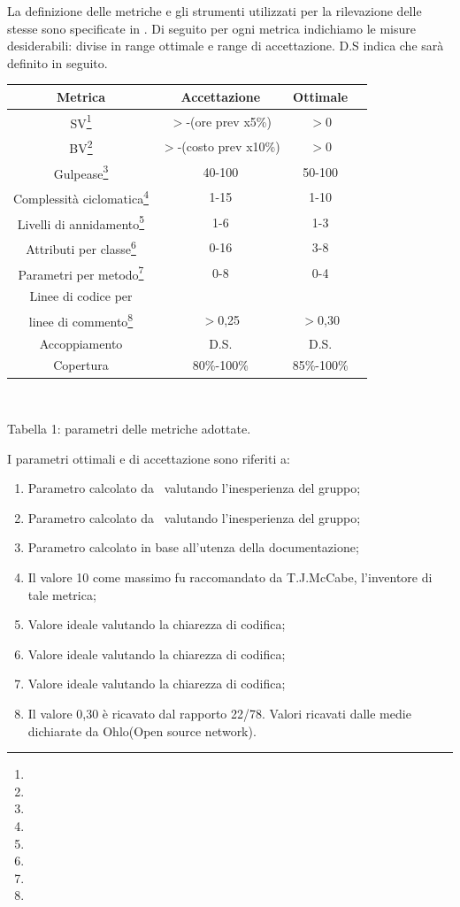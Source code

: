 La definizione delle metriche e gli strumenti utilizzati per la rilevazione delle stesse sono specificate in \infoNDP. Di seguito per ogni metrica indichiamo le misure desiderabili: divise in range ottimale e range di accettazione. D.S indica che sarà definito in seguito.\\
\begin{tabular}{|c|c|c|c|}
\hline
\textbf{Metrica} & \textbf{Accettazione} & \textbf{Ottimale}\\
\hline
SV\footnote{}&$>$-(ore prev x5\%)&$>$0\\
\hline
BV\footnote{}&$>$-(costo prev x10\%)&$>$0\\
\hline
Gulpease\footnote{}&40-100&50-100\\
\hline
Complessità ciclomatica\footnote{}&1-15&1-10\\
\hline
Livelli di annidamento\footnote{}&1-6&1-3\\
\hline
Attributi per classe\footnote{}&0-16&3-8\\
\hline
Parametri per metodo\footnote{}&0-8&0-4\\
\hline
Linee di codice per &&\\linee di commento\footnote{}&$>$0,25&$>$0,30\\
\hline
Accoppiamento&D.S.&D.S.\\
\hline
Copertura&80\%-100\%&85\%-100\%\\
\hline
\end{tabular}\\
\begin{center}
Tabella 1: parametri delle metriche adottate.
\end{center}
I parametri ottimali e di accettazione sono riferiti a:
\begin{enumerate}
\item Parametro calcolato da \gruppo ~valutando l'inesperienza del gruppo;
\item Parametro calcolato da \gruppo ~valutando l'inesperienza del gruppo;
\item Parametro calcolato in base all'utenza della documentazione;
\item Il valore 10 come massimo fu raccomandato da T.J.McCabe, l'inventore di tale metrica;
\item Valore ideale valutando la chiarezza di codifica;
\item Valore ideale valutando la chiarezza di codifica;
\item Valore ideale valutando la chiarezza di codifica;
\item Il valore 0,30 è ricavato dal rapporto 22/78. Valori ricavati dalle medie dichiarate da Ohlo(Open source network).
\end{enumerate}
